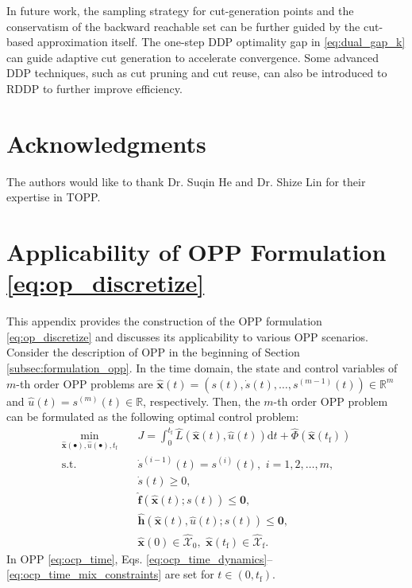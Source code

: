 \documentclass[journal]{IEEEtran}
\theoremstyle{definition}
\theoremstyle{definition}
\newcommand\R{{\mathbb{R}}}
\newcommand\st{{\text{s.t.}}}
\renewcommand\vector[1]{\boldsymbol{#1}}
\newcommand\vf{{\vector{f}}}
\newcommand\vh{{\vector{h}}}
\newcommand\vx{{\vector{x}}}
\newcommand\vzero{{\vector{0}}}
\begin{document}
In future work, the sampling strategy for cut-generation points and the conservatism of the backward reachable set can be further guided by the cut-based approximation itself. The one-step DDP optimality gap in \eqref{eq:dual_gap_k} can guide adaptive cut generation to accelerate convergence. Some advanced DDP techniques, such as cut pruning and cut reuse, can also be introduced to RDDP to further improve efficiency.

\section*{Acknowledgments}

The authors would like to thank Dr. Suqin He and Dr. Shize Lin for their expertise in TOPP.

\appendices

\section{Applicability of OPP Formulation \eqref{eq:op_discretize}}\label{app:applicability}

This appendix provides the construction of the OPP formulation \eqref{eq:op_discretize} and discusses its applicability to various OPP scenarios. Consider the description of OPP in the beginning of Section \ref{subsec:formulation_opp}. In the time domain, the state and control variables of $m$-th order OPP problems are $\hat{\vx}(t)=(s(t), \dot{s}(t), \ldots, s^{(m-1)}(t))\in\R^m$ and $\hat{u}(t)=s^{(m)}(t)\in\R$, respectively. Then, the $m$-th order OPP problem can be formulated as the following optimal control problem:
\begin{subequations}\label{eq:ocp_time}
    \begin{align}
        \min_{\hat{\vx}(\bullet), \hat{u}(\bullet), t_\text{f}} \quad &J = \int_0^{t_\text{f}} \widehat{L}(\hat{\vx}(t), \hat{u}(t)) \mathrm{d}t + \widehat\Phi(\hat{\vx}(t_\text{f})) \label{eq:ocp_time_objective}\\
        \st \quad & \dot{s}^{(i-1)}(t) = s^{(i)}(t), \,\,i=1,2,\ldots,m, \\
        &\dot{s}(t) \geq 0,\label{eq:ocp_time_dynamics}\\
        &\hat{\vf}(\hat{\vx}(t); s(t)) \leq \vzero,  \label{eq:ocp_time_state_constraints}\\
        &\hat{\vh}(\hat{\vx}(t), \hat{u}(t); s(t)) \leq \vzero, \label{eq:ocp_time_mix_constraints} \\
        &\hat{\vx}(0)\in\widehat{\mathcal{X}}_0, \,\, \hat{\vx}(t_\text{f})\in\widehat{\mathcal{X}}_\text{f}.\label{eq:ocp_time_boundary}
    \end{align}
\end{subequations}
In OPP \eqref{eq:ocp_time}, Eqs. \eqref{eq:ocp_time_dynamics}--\eqref{eq:ocp_time_mix_constraints} are set for $t\in(0,t_\text{f})$.
\end{document}

